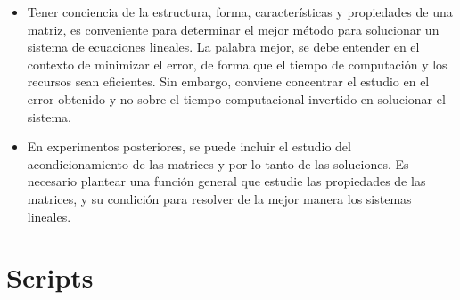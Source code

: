 \documentclass[11pt, spanish]{article}
\begin{document}
\begin{itemize}
  \item Tener conciencia de la estructura, forma, características y propiedades de una matriz, es conveniente para determinar el mejor método para solucionar un sistema de ecuaciones lineales. La palabra mejor, se debe entender en el contexto de minimizar el error, de forma que el tiempo de computación y los recursos sean eficientes. Sin embargo, conviene concentrar el estudio en el error obtenido y no sobre el tiempo computacional invertido en solucionar el sistema.
  
   \item En experimentos posteriores, se puede incluir el estudio del acondicionamiento de las matrices y por lo tanto de las soluciones. Es necesario plantear una función general que estudie las propiedades de las matrices, y su condición para resolver de la mejor manera los sistemas lineales.
\end{itemize}

\newpage


\section{Scripts}





\newpage






\end{document}
